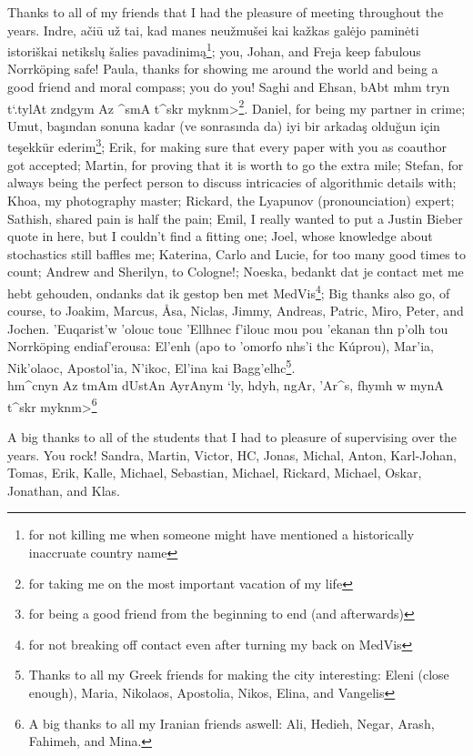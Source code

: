 Thanks to all of my friends that I had the pleasure of meeting throughout the years.  Indre, a\v{c}i\={u} u\v{z} tai, kad manes neu\v{z}mu\v{s}ei kai ka\v{z}kas gal\.{e}jo pamin\.{e}ti istori\v{s}kai netiksl\k{u} \v{s}alies pavadinim\k{a}\footnote{for not killing me when someone might have mentioned a historically inaccruate country name}; you, Johan, and Freja keep fabulous Norrk\"oping safe!  Paula, thanks for showing me around the world and being a good friend and moral compass; you do you!  Saghi and Ehsan, {\small \<bAbt mhm tryn t`.tylAt zndgym Az ^smA t^skr myknm>}\footnote{for taking me on the most important vacation of my life}.  Daniel, for being my partner in crime;  Umut, ba\c{s}{\i}ndan sonuna kadar (ve sonras{\i}nda da) iyi bir arkada\c{s} oldu\u{g}un i\c{c}in te\c{s}ekk\"ur ederim\footnote{for being a good friend from the beginning to end (and afterwards)};  Erik, for making sure that every paper with you as coauthor got accepted;  Martin, for proving that it is worth to go the extra mile;  Stefan, for always being the perfect person to discuss intricacies of algorithmic details with;  Khoa, my photography master;  Rickard, the Lyapunov (pronounciation) expert;  Sathish, shared pain is half the pain;  Emil, I really wanted to put a Justin Bieber quote in here, but I couldn't find a fitting one;  Joel, whose knowledge about stochastics still baffles me;  Katerina, Carlo and Lucie, for too many good times to count;  Andrew and Sherilyn, to Cologne!;  Noeska, bedankt dat je contact met me hebt gehouden, ondanks dat ik gestop ben met MedVis\footnote{for not breaking off contact even after turning my back on MedVis};  Big thanks also go, of course, to Joakim, Marcus, \AA sa, Niclas, Jimmy, Andreas, Patric, Miro, Peter, and Jochen. \textgreek{'Euqarist'w 'olouc touc 'Ellhnec f'ilouc mou pou 'ekanan thn p'olh tou} Norrk\"oping \textgreek{endiaf'erousa: El'enh (apo to 'omorfo nhs'i thc K\'uprou), Mar'ia, Nik'olaoc, Apostol'ia, N'ikoc, El'ina kai Bagg'elhc}\footnote{Thanks to all my Greek friends for making the city interesting: Eleni (close enough), Maria, Nikolaos, Apostolia, Nikos, Elina, and Vangelis}.  \\{\small \<hm^cnyn Az tmAm dUstAn AyrAnym `ly, hdyh, ngAr, 'Ar^s, fhymh w mynA t^skr myknm>}\footnote{A big thanks to all my Iranian friends aswell: Ali, Hedieh, Negar, Arash, Fahimeh, and Mina.}

A big thanks to all of the students that I had to pleasure of supervising over the years.  You rock! Sandra, Martin, Victor, HC, Jonas, Michal, Anton, Karl-Johan, Tomas, Erik, Kalle, Michael, Sebastian, Michael, Rickard, Michael, Oskar, Jonathan, and Klas.

